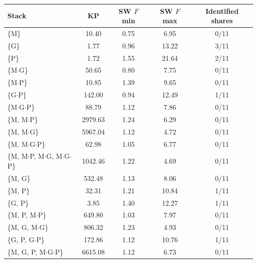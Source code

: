 \begin{tabular}{@{}lcccc@{}}
\toprule
Stack & KP & SW $F$ min & SW $F$ max & Identified shares \\
\midrule
\{M\} & 10.40 & 0.75 & 6.95 & 0/11 \\
\{G\} & 1.77 & 0.96 & 13.22 & 3/11 \\
\{P\} & 1.72 & 1.55 & 21.64 & 2/11 \\
\{M$\cdot$G\} & 50.65 & 0.80 & 7.75 & 0/11 \\
\{M$\cdot$P\} & 10.85 & 1.39 & 9.65 & 0/11 \\
\{G$\cdot$P\} & 142.00 & 0.94 & 12.49 & 1/11 \\
\{M$\cdot$G$\cdot$P\} & 88.79 & 1.12 & 7.86 & 0/11 \\
\addlinespace
\{M, M$\cdot$P\} & 2979.63 & 1.24 & 6.29 & 0/11 \\
\{M, M$\cdot$G\} & 5967.04 & 1.12 & 4.72 & 0/11 \\
\{M, M$\cdot$G$\cdot$P\} & 62.98 & 1.05 & 6.77 & 0/11 \\
\{M, M$\cdot$P, M$\cdot$G, M$\cdot$G$\cdot$P\} & 1042.46 & 1.22 & 4.69 & 0/11 \\
\addlinespace
\{M, G\} & 532.48 & 1.13 & 8.06 & 0/11 \\
\{M, P\} & 32.31 & 1.21 & 10.84 & 1/11 \\
\{G, P\} & 3.85 & 1.40 & 12.27 & 1/11 \\
\addlinespace
\{M, P, M$\cdot$P\} & 649.80 & 1.03 & 7.97 & 0/11 \\
\{M, G, M$\cdot$G\} & 806.32 & 1.23 & 4.93 & 0/11 \\
\{G, P, G$\cdot$P\} & 172.86 & 1.12 & 10.76 & 1/11 \\
\{M, G, P, M$\cdot$G$\cdot$P\} & 6615.08 & 1.12 & 6.73 & 0/11 \\
\bottomrule
\end{tabular}
